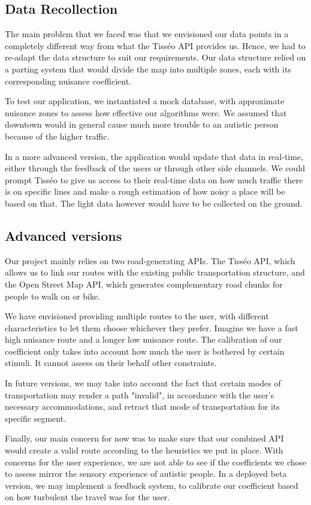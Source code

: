 \newpage


\subsection{Data Recollection}


The main problem that we faced was that we envisioned our data points in a completely different way from what the Tisséo API provides us. Hence, we had to re-adapt the data structure to suit our requirements. Our data structure relied on a parting system that would divide the map into multiple zones, each with its corresponding nuisance coefficient.


To test our application, we instantiated a mock database, with approximate nuisance zones to assess how effective our algorithms were. We assumed that downtown would in general cause much more trouble to an autistic person because of the higher traffic.


In a more advanced version, the application would update that data in real-time, either through the feedback of the users or through other side channels. We could prompt Tisséo to give us access to their real-time data on how much traffic there is on specific lines and make a rough estimation of how noisy a place will be based on that. The light data however would have to be collected on the ground.


\subsection{Advanced versions}


Our project mainly relies on two road-generating APIs. The Tisséo API, which allows us to link our routes with the existing public transportation structure, and the Open Street Map API, which generates complementary road chunks for people to walk on or bike.


We have envisioned providing multiple routes to the user, with different characteristics to let them choose whichever they prefer. Imagine we have a fast high nuisance route and a longer low nuisance route. The calibration of our coefficient only takes into account how much the user is bothered by certain stimuli. It cannot assess on their behalf other constraints.


In future versions, we may take into account the fact that certain modes of transportation may render a path "invalid", in accordance with the user's necessary accommodations, and retract that mode of transportation for its specific segment.


Finally, our main concern for now was to make sure that our combined API would create a valid route according to the heuristics we put in place. With concerns for the user experience, we are not able to see if the coefficients we chose to assess mirror the sensory experience of autistic people. In a deployed beta version, we may implement a feedback system, to calibrate our coefficient based on how turbulent the travel was for the user.
